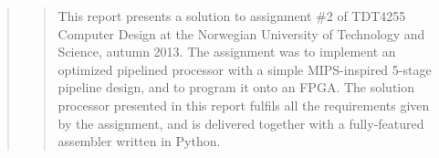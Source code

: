 \begin{quote}
\begin{quote}
This report presents a solution to assignment \#2 of TDT4255 Computer Design at the Norwegian University of Technology and Science, autumn 2013.
The assignment was to implement an optimized pipelined processor with a simple MIPS-inspired 5-stage pipeline design, and to program it onto an FPGA.
The solution processor presented in this report fulfils all the requirements given by the assignment, and is delivered together with a fully-featured assembler written in Python.
\end{quote}
\end{quote}
